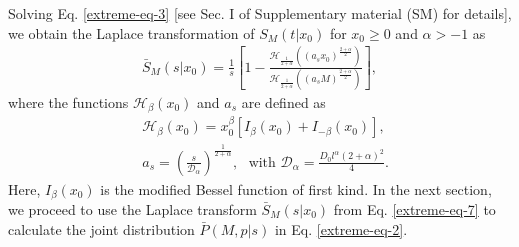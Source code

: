 \documentclass[showpacs,amsmath,amssymb,aps,pre,twocolumn,]{revtex4-1}
\def\greenw#1{{\color{black} #1}}
\begin{document}
\greenw{Solving Eq. \eqref{extreme-eq-3} [see Sec. I of Supplementary material (SM) \cite{Supplementary} for details], we obtain the Laplace transformation of $S_M(t|x_0)$ for $x_0 \geq 0$ and $\alpha > -1$ as} 
\begin{align}
\bar{S}_M(s|x_0) = \frac{1}{s} \left[1- \frac{\mathcal{H}_{\frac{1}{2+\alpha}} \left( (a_s x_0)^{\frac{2+\alpha}{2}} \right)}{\mathcal{H}_{\frac{1}{2+\alpha}} \left( (a_s M)^{\frac{2+\alpha}{2}} \right)} \right],
\label{extreme-eq-7}
\end{align} 
where the functions $\mathcal{H}_{\beta} (x_0)$ and $a_s$ are defined as
\begin{align}
 & \mathcal{H}_{\beta} (x_0) = x_0 ^{\beta} \left[ I _{\beta}(x_0)+I_{-\beta} (x_0)\right],\label{extreme-eq-8} \\
 & a_s  = \left(\frac{s}{\mathcal{D}_{\alpha}} \right)^{\frac{1}{2+\alpha}},~~~\text{with }\mathcal{D}_{\alpha} = \frac{D_0 l^{\alpha} (2+\alpha)^2}{4}.\label{extreme-eq-9} 
\end{align}
Here, $I _{\beta}(x_0)$ is the modified Bessel function of first kind. In the next section, we proceed to use the Laplace transform $\bar{S}_M(s|x_0)$ from Eq. \eqref{extreme-eq-7} to calculate the joint distribution $\bar{P}(M, p|s)$ in Eq. \eqref{extreme-eq-2}.
\end{document}
